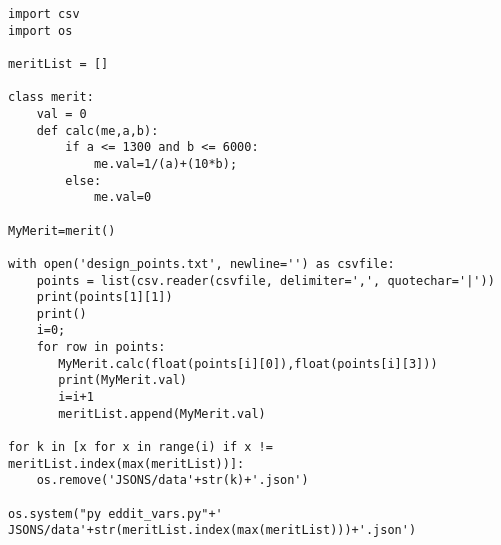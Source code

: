 \vspace{5pt}
\FloatBarrier
\begin{verbatim}
import csv
import os

meritList = []

class merit:
    val = 0
    def calc(me,a,b):
        if a <= 1300 and b <= 6000:
            me.val=1/(a)+(10*b);
        else:
            me.val=0
        
MyMerit=merit()

with open('design_points.txt', newline='') as csvfile:
    points = list(csv.reader(csvfile, delimiter=',', quotechar='|'))
    print(points[1][1])
    print()
    i=0;
    for row in points:
       MyMerit.calc(float(points[i][0]),float(points[i][3]))
       print(MyMerit.val)
       i=i+1
       meritList.append(MyMerit.val)

for k in [x for x in range(i) if x != meritList.index(max(meritList))]:
    os.remove('JSONS/data'+str(k)+'.json')

os.system("py eddit_vars.py"+' JSONS/data'+str(meritList.index(max(meritList)))+'.json')

\end{verbatim}

